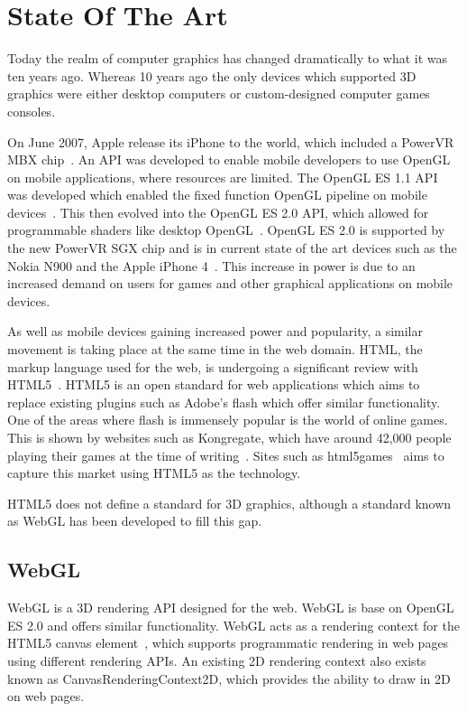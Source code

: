 \chapter{State Of The Art}
Today the realm of computer graphics has changed dramatically to what it was ten years ago.
Whereas 10 years ago the only devices which supported 3D graphics were either desktop computers or custom-designed computer games consoles.

On June 2007, Apple release its iPhone to the world, which included a PowerVR MBX chip~\cite{web:powervrmbx}.
An API was developed to enable mobile developers to use OpenGL on mobile applications, where resources are limited.
The OpenGL ES 1.1 API was developed which enabled the fixed function OpenGL pipeline on mobile devices~\cite{web:opengles11}.
This then evolved into the OpenGL ES 2.0 API, which allowed for programmable shaders like desktop OpenGL~\cite{web:opengles20}.
OpenGL ES 2.0 is supported by the new PowerVR SGX chip and is in current state of the art devices such as the Nokia N900 and the Apple iPhone 4~\cite{web:powervrsgx}.
This increase in power is due to an increased demand on users for games and other graphical applications on mobile devices.

As well as mobile devices gaining increased power and popularity, a similar movement is taking place at the same time in the web domain.
HTML, the markup language used for the web, is undergoing a significant review with HTML5~\cite{web:html5}.
HTML5 is an open standard for web applications which aims to replace existing plugins such as Adobe's flash which offer similar functionality.
One of the areas where flash is immensely popular is the world of online games.
This is shown by websites such as Kongregate, which have around 42,000 people playing their games at the time of writing~\cite{web:kongregate}.
Sites such as html5games~\cite{web:html5games} aims to capture this market using HTML5 as the technology.

HTML5 does not define a standard for 3D graphics, although a standard known as WebGL has been developed to fill this gap.

\section{WebGL}
WebGL is a 3D rendering API designed for the web.
WebGL is base on OpenGL ES 2.0 and offers similar functionality.
WebGL acts as a rendering context for the HTML5 canvas element~\cite{web:html5canvas}, which supports programmatic rendering in web pages using different rendering APIs.
An existing 2D rendering context also exists known as CanvasRenderingContext2D, which provides the ability to draw in 2D on web pages.

